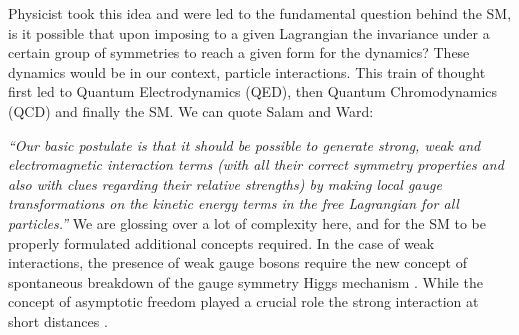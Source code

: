 Physicist took this idea and were led to the fundamental question behind the SM, is it possible that upon imposing to a given Lagrangian the invariance under a certain group of symmetries to reach a given form for  the dynamics? 
%
These dynamics would be in our context, particle interactions. This train of thought first led to Quantum Electrodynamics (QED), then Quantum Chromodynamics (QCD) and finally the SM.  
%
We can quote Salam and Ward: %

\textit{“Our basic postulate is that it should be possible to generate strong,  weak and electromagnetic  interaction terms (with all their correct symmetry properties and also with clues regarding their relative strengths) by making local gauge transformations on the kinetic energy terms in the free Lagrangian for all particles.”}
We are glossing over a lot of complexity here, and for the SM to be properly formulated\Joaoadd{,} additional concepts  required. In the case of  weak interactions, the presence of  weak gauge bosons require the new concept of spontaneous breakdown of the gauge symmetry  Higgs mechanism \cite{higgs1964broken,englert1964broken,guralnik1964global} . 
%
While the concept of asymptotic freedom played a crucial role  the strong interaction at short distances \cite{politzer1973reliable,gross1973ultraviolet} .  


